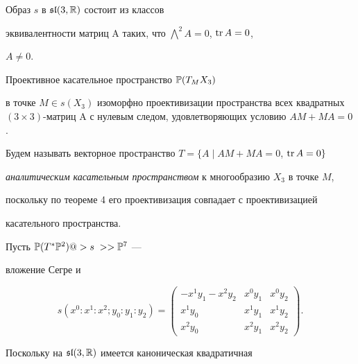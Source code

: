 \begin{thm}


Образ $s$ в $\frak{sl}(3,\Bbb{R})$ состоит из классов 


эквивалентности матриц A таких, что $\bigwedge\limits^2 A=0$, $\operatorname{tr} A=0$,


$A\neq 0$.


\end{thm}








\begin{thm}


Проективное касательное пространство $\Bbb{P}(T_MX_3)$


в точке $M\in s(X_3)$ изоморфно проективизации пространства всех квадратных $(3


\times 3)$-матриц A с нулевым следом, удовлетворяющих условию $AM+MA=0$.


\end{thm}





Будем называть векторное пространство $T=\{A\mid AM+MA=0$, $\operatorname{tr} A=0\}$


{\it аналитическим касательным пространством} к многообразию $X_3$ в точке $M$,


поскольку по теореме 4 его проективизация совпадает с проективизацией 


касательного пространства.





Пусть $\Bbb{P}(T^{\ast}\Bbb{P}^2)@>{s\;}>>\Bbb{P}^7$ --- 


вложение Сегре и 


$$


s(x^0:x^1:x^2;y_0:y_1:y_2)=\begin{pmatrix}


-x^1y_1-x^2y_2 & x^0y_1 & x^0y_2 \\


x^1y_0 & x^1y_1 & x^1y_2 \\


x^2y_0 & x^2y_1 & x^2y_2


\end{pmatrix}.


$$





Поскольку на $\frak{sl}(3,\Bbb{R})$ имеется каноническая квадратичная


